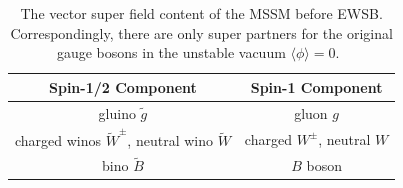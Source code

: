 \begin{table}[tb]
\caption{The vector super field content of the MSSM before EWSB. Correspondingly,
there are only super partners for the original gauge bosons in the unstable
 vacuum $\langle \phi \rangle =0$.~\label{tab:mssmbosons}}
\begin{center}
\begin{tabular}{cc}
\textbf{Spin-1/2 Component} & \textbf{Spin-1 Component} \\
\hline
gluino $\tilde{g}$ & gluon $g$\\
charged winos $\tilde{W}^{\pm}$, neutral wino $\tilde{W}$ & charged $W^\pm$, neutral $W$ \\
bino $\tilde{B}$ & $B$ boson 
\end{tabular} 
\end{center}
\end{table}

